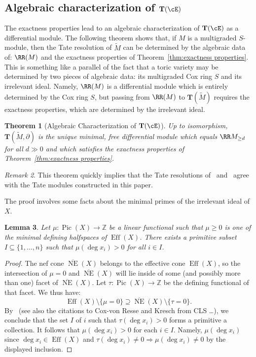 \documentclass[12pt]{amsart}
\newtheorem{lemma}{Lemma}[section]
\newtheorem{thm}[lemma]{Theorem}
\theoremstyle{definition}
\theoremstyle{remark}
\newtheorem{remark}[lemma]{Remark}
\newcommand{\Tate}{{\mathbf{T}}}
\newcommand{\ZZ}{\mathbb Z}
\newcommand{\NE}{\overline{\operatorname{NE}}}
\newcommand{\Eff}{\operatorname{Eff}}
\newcommand{\Pic}{\operatorname{Pic}}
\newcommand{\daniel}[1]{{\color{blue} \sf $\clubsuit\clubsuit\clubsuit$ Daniel: [#1]}}
\begin{document}
\subsection{Algebraic characterization of $\Tate(\cE)$}
The exactness properties lead to an algebraic characterization of $\Tate(\cE)$ as a differential module. 
The following theorem shows that, if $M$ is a multigraded $S$-module, then the Tate resolution of $\widetilde{M}$ can be determined by the algebraic data of: $\RR(M)$ and the exactness properties of Theorem~\ref{thm:exactness properties}.  This is something like a parallel of the fact that a toric variety may be determined by two pieces of algebraic data:  its multigraded Cox ring $S$ and its irrelevant ideal.   Namely, $\RR(M)$ is a differential module which is entirely determined by the Cox ring $S$, but passing from $\RR(M)$ to $\Tate(\widetilde{M})$ requires the exactness properties, which are determined by the irrelevant ideal. 
%



\begin{thm}[Algebraic Characterization of $\Tate(\cE)$]\label{thm:alg characterization}
Up to isomorphism, $\Tate(\widetilde{M},\partial)$ is the unique minimal, free differential module which equals $\RR M_{\geq d}$ for all $d\gg 0$ and which satisfies the exactness properties of Theorem~\ref{thm:exactness properties}.
\end{thm}
\begin{remark}
This theorem quickly implies that the Tate resolutions of~\cite{EFS} and~\cite{EES} agree with the Tate modules constructed in this paper.
\end{remark}
The proof involves some facts about the minimal primes of the irrelevant ideal of $X$.

\begin{lemma}\label{lem:degI}
Let $\mu: \Pic(X)\to \ZZ$ be a linear functional such that $\mu\geq 0$ is one of the minimal defining halfspaces of $\Eff(X)$.  There exists a primitive subset $I\subseteq \{1,\dots,n\}$ such that $\mu( \deg x_i)>0$ for all $i\in I$.
\end{lemma}
\begin{proof}
The nef cone $\NE(X)$ belongs to the effective cone $\Eff(X)$, so the intersection of $\mu=0$ and $\NE(X)$ will lie inside of some (and possibly more than one) facet of $\NE(X)$.  Let $\tau: \Pic(X)\to \ZZ$ be the defining functional of that facet.  We thus have:
\[
\Eff(X) \setminus \{\mu=0\} \supseteq \NE(X) \setminus \{\tau = 0\}.
\]
 By~\cite[Proof of Theorem~6.4.11]{CLS} (see also the citations to Cox-von Resse and Kresch from CLS \dots), we conclude that the set $I$ of $i$ such that $\tau(\deg x_i)>0$ forms a primitive a collection.  It follows that $\mu(\deg x_i)> 0$ for each $i\in I$.  Namely, $\mu(\deg x_i)$ since $\deg x_i\in \Eff(X)$ and $\tau(\deg x_i)\ne 0 \Rightarrow \mu(\deg x_i)\ne 0$ by the displayed inclusion.
\end{proof}
\end{document}
